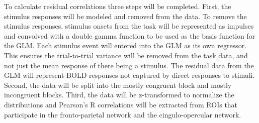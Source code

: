 \documentclass[phd,appendix,figures]{uithesis}
\begin{document}
To calculate residual correlations three steps will be completed.
First, the stimulus responses will be modeled and removed from the data.
To remove the stimulus responses, stimulus onsets from the task will be represented as impulses and convolved with a double gamma function to be used as the basis function for the GLM. 
Each stimulus event will entered into the GLM as its own regressor.
This ensures the trial-to-trial variance will be removed from the task data, and not just the mean response of there being a stimulus. 
The residual data from the GLM will represent BOLD responses not captured by direct responses to stimuli. 
Second, the data will be split into the mostly congruent block and mostly incongruent blocks.
Third,  the data will be z-transformed to normalize the distributions and Pearson's R correlations will be extracted from ROIs that participate in the fronto-parietal network and the cingulo-opercular network.
\end{document}
